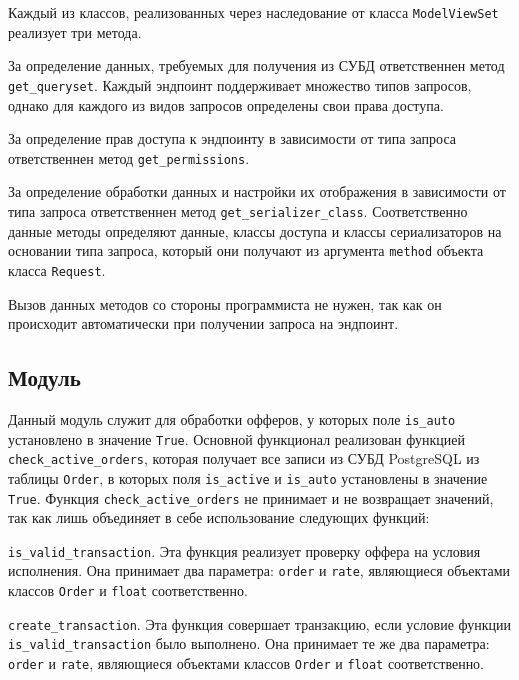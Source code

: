 Каждый из классов, реализованных через наследование от класса \lstinline{ModelViewSet} реализует три метода.

За определение данных, требуемых для получения из СУБД ответственнен метод \lstinline{get_queryset}.
Каждый эндпоинт поддерживает множество типов запросов, однако для каждого из видов запросов определены свои права доступа.

За определение прав доступа к эндпоинту в зависимости от типа запроса ответственнен метод \lstinline{get_permissions}.

За определение обработки данных и настройки их отображения в зависимости от типа запроса ответственнен метод \lstinline{get_serializer_class}.
Соответственно данные методы определяют данные, классы доступа и классы сериализаторов на основании типа запроса,
который они получают из аргумента \lstinline{method} объекта класса \lstinline{Request}.

Вызов данных методов со стороны программиста не нужен, так как он происходит автоматически при получении запроса на эндпоинт.

\subsection{Модуль \moduleAutoTrading}\label{subsec:func:module-autotrading}
Данный модуль служит для обработки офферов, у которых поле \lstinline{is_auto} установлено в значение \lstinline{True}.
Основной функционал реализован функцией \lstinline{check_active_orders},
которая получает все записи из СУБД PostgreSQL из таблицы \lstinline{Order}, в которых поля \lstinline{is_aсtive} и \lstinline{is_auto} установлены в значение \lstinline{True}.
Функция \lstinline{check_active_orders} не принимает и не возвращает значений, так как лишь объединяет в себе использование
следующих функций:
\begin{enumerate_num}
    \item \lstinline{is_valid_transaction}.
    Эта функция реализует проверку оффера на условия исполнения.
    Она принимает два параметра: \lstinline{order} и \lstinline{rate},
    являющиеся объектами классов \lstinline{Order} и \lstinline{float} соответственно.
    \item \lstinline{create_transaction}.
    Эта функция совершает транзакцию, если условие функции \lstinline{is_valid_transaction} было выполнено.
    Она принимает те же два параметра: \lstinline{order} и \lstinline{rate},
    являющиеся объектами классов \lstinline{Order} и \lstinline{float} соответственно.
\end{enumerate_num}

